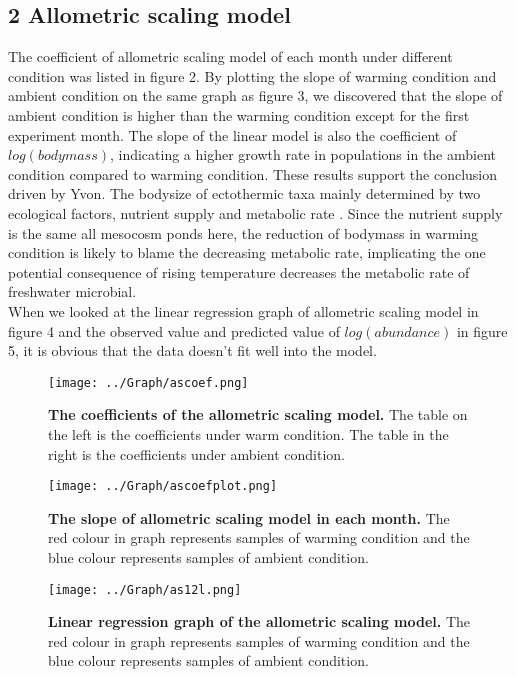 \documentclass[11pt]{article}
\begin{document}
\begin{linenumbers}
\section*{2 Allometric scaling model}
The coefficient of allometric scaling model of each month under different condition was listed in figure 2. By plotting the slope of warming condition and ambient condition on the same graph as figure 3, we discovered that the slope of ambient condition is higher than the warming condition except for the first experiment month. The slope of the linear model is also the coefficient of $log(bodymass)$, indicating a higher growth rate in populations in the ambient condition compared to warming condition. These results support the conclusion driven by Yvon.
The bodysize of ectothermic taxa mainly determined by two ecological factors, nutrient supply and metabolic rate \cite{sheridan2011shrinking}. Since the nutrient supply is the same all mesocosm ponds here, the reduction of bodymass in warming condition is likely to blame the decreasing metabolic rate, implicating the one potential consequence of rising temperature decreases the metabolic rate of freshwater microbial.  \\
When we looked at the linear regression graph of allometric scaling model in figure 4 and the observed value and predicted value of $log(abundance)$ in figure 5, it is obvious that the data doesn't fit well into the model.
\begin{figure}[H]
  \centering
  \texttt{[image: ../Graph/ascoef.png]}
  \caption{\textbf{The coefficients of the allometric scaling model.}  The table on the left is the coefficients under warm condition. The table in the right is the coefficients under ambient condition. }
\end{figure}

\begin{figure}[H]
  \centering
  \texttt{[image: ../Graph/ascoefplot.png]}
  \caption{\textbf{The slope of allometric scaling model in each month.}  The red colour in graph represents samples of warming condition and the blue colour represents samples of ambient condition. }
\end{figure}

\begin{figure}[H]
  \centering
  \texttt{[image: ../Graph/as12l.png]}
  \caption{\textbf{Linear regression graph of the allometric scaling model.}
  The red colour in graph represents samples of warming condition and the blue colour represents samples of ambient condition. }
\end{figure}


\end{linenumbers}
\end{document}
